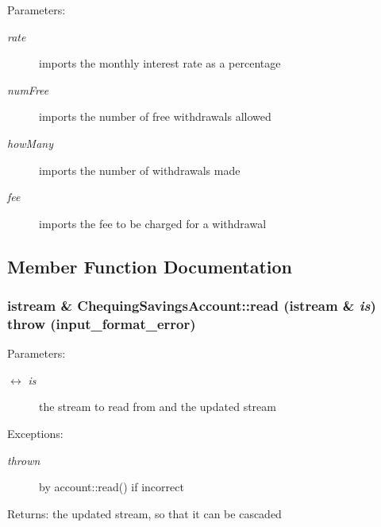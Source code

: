 \begin{Desc}
\item[Parameters:]
\begin{description}
\item[{\em rate}]imports the monthly interest rate as a percentage \item[{\em numFree}]imports the number of free withdrawals allowed \item[{\em howMany}]imports the number of withdrawals made \item[{\em fee}]imports the fee to be charged for a withdrawal \end{description}
\end{Desc}


\subsection{Member Function Documentation}
\hypertarget{classChequingSavingsAccount_c0de0e2d3ac55227f31a4715ae257646}{
\subsubsection[read]{\setlength{\rightskip}{0pt plus 5cm}istream \& ChequingSavingsAccount::read (istream \& {\em is})  throw (input\_\-format\_\-error)}}
\label{classChequingSavingsAccount_c0de0e2d3ac55227f31a4715ae257646}


\begin{Desc}
\item[Parameters:]
\begin{description}
\item[\mbox{$\leftrightarrow$} {\em is}]the stream to read from and the updated stream \end{description}
\end{Desc}
\begin{Desc}
\item[Exceptions:]
\begin{description}
\item[{\em thrown}]by account::read() if incorrect \end{description}
\end{Desc}
\begin{Desc}
\item[Returns:]the updated stream, so that it can be cascaded \end{Desc}



